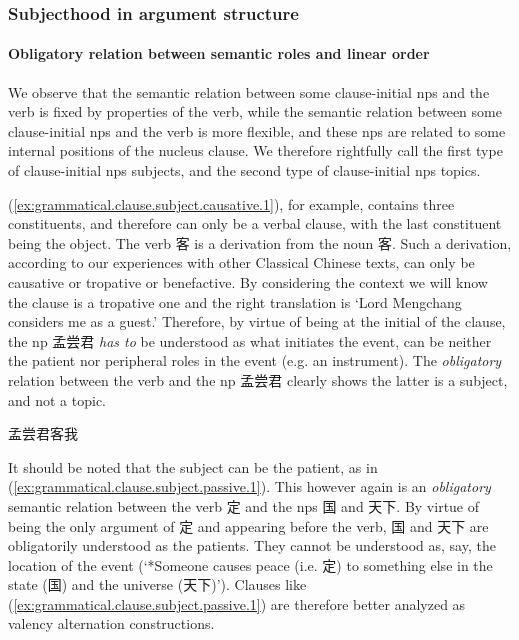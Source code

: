 \documentclass[UTF8, a4paper, oneside, scheme=plain, 12pt]{ctexrep}
\newcommand{\translate}[1]{`#1'}
\begin{document}
\subsubsection{Subjecthood in argument structure}\label{sec:grammatical.verbal.subject.argument-structure}

\paragraph{Obligatory relation between semantic roles and linear order}

We observe that 
the semantic relation between some clause-initial \ac{np}s and the verb 
is fixed by properties of the verb,
while the semantic relation between some clause-initial \ac{np}s and the verb is more flexible,
and these \acp{np} are related to some internal positions of the nucleus clause.
We therefore rightfully call the first type of clause-initial \acp{np} subjects,
and the second type of clause-initial \acp{np} topics.

(\ref{ex:grammatical.clause.subject.causative.1}), for example, contains three constituents,
and therefore can only be a verbal clause, with the last constituent being the object.
The verb 客 is a derivation from the noun 客.
Such a derivation, according to our experiences with other Classical Chinese texts,
can only be causative or tropative or benefactive.
By considering the context we will know the clause is a tropative one
and the right translation is \translate{Lord Mengchang considers me as a guest.}
Therefore, by virtue of being at the initial of the clause, 
the \ac{np} 孟尝君 \emph{has to} be understood as what initiates the event,
can be neither the patient nor peripheral roles in the event (e.g. an instrument).
The \emph{obligatory} relation between the verb and the \ac{np} 孟尝君 
clearly shows the latter is a subject, and not a topic.

\begin{exe}
    \ex\label{ex:grammatical.clause.subject.causative.1} 孟尝君客我 
\end{exe}

It should be noted that the subject can be the patient,
as in (\ref{ex:grammatical.clause.subject.passive.1}).
This however again is an \emph{obligatory} semantic relation
between the verb 定 and the \ac{np}s 国 and 天下.
By virtue of being the only argument of 定 and appearing before the verb,
国 and 天下 are obligatorily understood as the patients.
They cannot be understood as, say, the location of the event
(\translate{*Someone causes peace (i.e. 定) to something else in the state (国) and the universe (天下)}).
Clauses like (\ref{ex:grammatical.clause.subject.passive.1})
are therefore better analyzed as valency alternation constructions.
\end{document}
